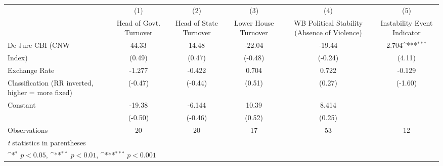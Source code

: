 {
\def\sym#1{\ifmmode^{#1}\else\(^{#1}\)\fi}
\begin{tabular}{l*{5}{c}}
\hline\hline
                    &\multicolumn{1}{c}{(1)}&\multicolumn{1}{c}{(2)}&\multicolumn{1}{c}{(3)}&\multicolumn{1}{c}{(4)}&\multicolumn{1}{c}{(5)}\\
                    &\multicolumn{1}{c}{Head of Govt. Turnover}&\multicolumn{1}{c}{Head of State Turnover}&\multicolumn{1}{c}{Lower House Turnover}&\multicolumn{1}{c}{WB Political Stability (Absence of Violence)}&\multicolumn{1}{c}{Instability Event Indicator}\\
\hline
De Jure CBI (CNW    &       44.33         &       14.48         &      -22.04         &      -19.44         &       2.704\sym{***}\\
Index)              &      (0.49)         &      (0.47)         &     (-0.48)         &     (-0.24)         &      (4.11)         \\
[1em]
Exchange Rate       &      -1.277         &      -0.422         &       0.704         &       0.722         &      -0.129         \\
Classification (RR inverted, higher = more fixed)&     (-0.47)         &     (-0.44)         &      (0.51)         &      (0.27)         &     (-1.60)         \\
[1em]
Constant            &      -19.38         &      -6.144         &       10.39         &       8.414         &                     \\
                    &     (-0.50)         &     (-0.46)         &      (0.52)         &      (0.25)         &                     \\
\hline
Observations        &          20         &          20         &          17         &          53         &          12         \\
\hline\hline
\multicolumn{6}{l}{\footnotesize \textit{t} statistics in parentheses}\\
\multicolumn{6}{l}{\footnotesize \sym{*} \(p<0.05\), \sym{**} \(p<0.01\), \sym{***} \(p<0.001\)}\\
\end{tabular}
}
